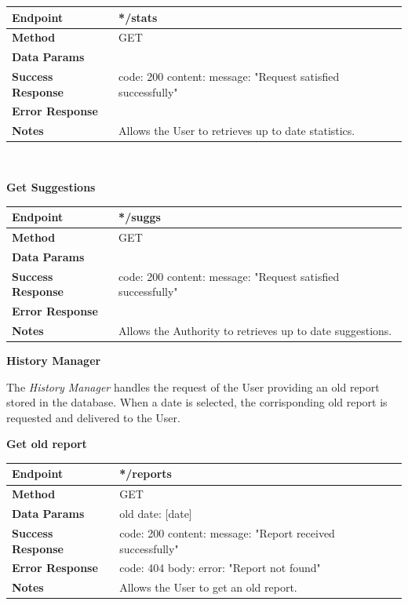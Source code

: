 \documentclass{report}
\begin{document}
    \begin{tabular}{| l | p{8cm} |}
        \hline
        \textbf{Endpoint} & */stats \\
        \hline
        \textbf{Method} & GET \\
        \hline
        \textbf{Data Params} & \\
        \hline
        \textbf{Success Response} &  code: 200 \newline content: {message: "Request satisfied successfully"}\\
        \hline
        \textbf{Error Response} & \\
        \hline
        \textbf{Notes} & Allows the User to retrieves up to date statistics. \\
        \hline
    \end{tabular}
\\
\begin{center}{\textbf{Get Suggestions}}\end{center}
    \begin{tabular}{| l | p{8cm} |}
        \hline
        \textbf{Endpoint} & */suggs \\
        \hline
        \textbf{Method} & GET \\
        \hline
        \textbf{Data Params} & \\
        \hline
        \textbf{Success Response} &  code: 200 \newline content: {message: "Request satisfied successfully"}\\
        \hline
        \textbf{Error Response} & \\
        \hline
        \textbf{Notes} & Allows the Authority to retrieves up to date suggestions. \\
        \hline
    \end{tabular}
\clearpage
\begin{center}\large{\textbf{History Manager}}\end{center}
    The \textit{History Manager} handles the request of the User providing an old report stored in the database. When a date is selected, the corrisponding old report is requested and delivered to the User.
\begin{center}{\textbf{Get old report}}\end{center}
    \begin{tabular}{| l | p{8cm} |}
        \hline
        \textbf{Endpoint} & */reports \\
        \hline
        \textbf{Method} & GET \\
        \hline
        \textbf{Data Params} & old date: [date]\\
        \hline
        \textbf{Success Response} &  code: 200 \newline content: {message: "Report received successfully"}\\
        \hline
        \textbf{Error Response} & code: 404 \newline body: {error: "Report not found"}\\
        \hline
        \textbf{Notes} & Allows the User to get an old report. \\
        \hline
    \end{tabular}
\end{document}
